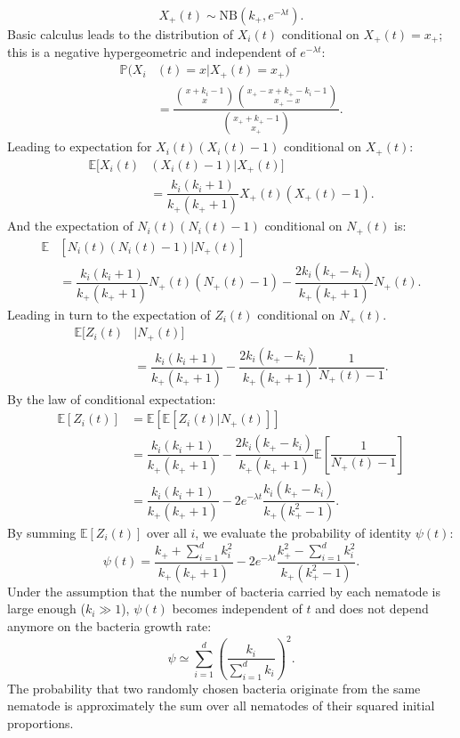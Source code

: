 \documentclass[10pt]{article}
\newcommand{\pr}{{\mathbb{P}}}
\begin{document}
\begin{boxframe}
\begin{multicols}{2}
\begin{equation}
 X_+(t)  \sim \mathrm{NB} \left( k_+, e^{-\lambda t} \right).
\end{equation}
Basic calculus leads to the distribution of $X_i(t)$ conditional on $ X_+(t)=x_+ $; this is a negative hypergeometric and independent of $e^{-\lambda t}$:
\begin{align}
\pr( X_i & (t) =x \vert X_+(t)=x_+ )  \nonumber \\ 
& = \dfrac{\displaystyle \binom{x+k_i-1}{x} \binom{x_+-x+k_+-k_i-1}{x_+-x}}{\displaystyle \binom{x_+ +k_+ -1}{x_+}}.
\end{align}
Leading to expectation for $X_i(t)(X_i(t)-1)$ conditional on $X_+(t)$:
\begin{align}
 \mathbb{E} [ X_i(t)& (X_i(t)-1) \vert X_+(t) ]  \nonumber \\
 &=\dfrac{k_i(k_i+1)}{k_+ (k_+ +1 )}X_+(t) ( X_+(t) -1 ).
\end{align}
And the expectation of $N_i(t)(N_i(t)-1)$ conditional on $N_+(t)$ is:
\begin{align}
 \mathbb{E} & [ N_i(t) (N_i(t)-1) \vert N_+(t) ]   \nonumber \\
 &=\dfrac{k_i(k_i+1) }{k_+ (k_+ +1)}N_+(t) ( N_+(t) -1 ) -\dfrac{2 k_i (k_+ - k_i) }{k_+ (k_+ +1)} N_+(t) .
\end{align}
Leading in turn to the expectation of $Z_i(t)$ conditional on $N_+(t)$.
\begin{align}
  \mathbb{E} [  Z_i(t)  & \vert N_+(t) ]  \nonumber \\
 &= \dfrac{k_i(k_i+1)}{k_+ (k_+ +1)}- \dfrac{2 k_i (k_+ -k_i)}{k_+ (k_+ +1)} \dfrac{1}{ N_+(t) -1  }.
\end{align}
By the law of conditional expectation:
\begin{align}
\mathbb{E}\left[ Z_i(t) \right] &= 
 \mathbb{E}\left[ \mathbb{E}\left[ \left. Z_i(t) \right\vert N_+(t) \right] \right]\\
 &=\dfrac{k_i(k_i+1)}{k_+ (k_+ +1 )}-\dfrac{2 k_i (k_+ -k_i)}{k_+ (k_+ +1 )}\mathbb{E}\left[\dfrac{1}{N_+(t)-1} \right] \\
 & =\dfrac{k_i(k_i+1)}{k_+ (k_+ +1 )}-2e^{-\lambda t}\dfrac{ k_i (k_+ -k_i)}{k_+ (k_+^2 -1 )}.
\end{align}
By summing $\mathbb{E}\left[ Z_i(t) \right]$ over all $i$, we evaluate the probability of identity $\psi(t)$:
\begin{equation}
\psi(t) =\dfrac{ k_+ + \sum_{i=1}^d k_i^2}{k_+ (k_+ +1)}  -2 e^{-\lambda t} \dfrac{ k_+^2-\sum_{i=1}^d k_i^2}{k_+ (k_+^2 -1) }.
\end{equation}
Under the assumption that the number of bacteria carried by each nematode is large enough ($k_i \gg 1$), $\psi(t)$ becomes independent of $t$ and does not depend anymore on 
 the bacteria growth rate:
 \begin{equation}
\psi \simeq \displaystyle \sum_{i=1}^d \left( \dfrac{ k_i}{\sum_{i=1}^d k_i} \right)^2.  
 \end{equation}
 The probability that two randomly chosen bacteria originate from the same nematode is approximately the sum over all nematodes of their squared initial proportions.
 \end{multicols}
\end{boxframe}
\end{document}
